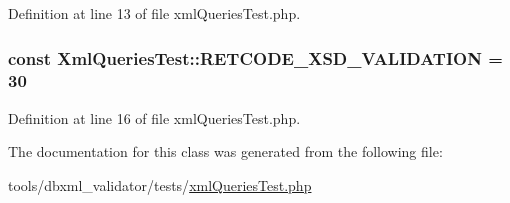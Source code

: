 Definition at line 13 of file xml\+Queries\+Test.\+php.

\hypertarget{classXmlQueriesTest_a0e375617451a3fc8ae53ce889d2ee3cf}{
\subsubsection[{R\+E\+T\+C\+O\+D\+E\+\_\+\+X\+S\+D\+\_\+\+V\+A\+L\+I\+D\+A\+T\+I\+O\+N}]{\setlength{\rightskip}{0pt plus 5cm}const Xml\+Queries\+Test\+::\+R\+E\+T\+C\+O\+D\+E\+\_\+\+X\+S\+D\+\_\+\+V\+A\+L\+I\+D\+A\+T\+I\+O\+N = 30}}\label{classXmlQueriesTest_a0e375617451a3fc8ae53ce889d2ee3cf}


Definition at line 16 of file xml\+Queries\+Test.\+php.



The documentation for this class was generated from the following file\+:\begin{DoxyCompactItemize}
\item 
tools/dbxml\+\_\+validator/tests/\hyperlink{xmlQueriesTest_8php}{xml\+Queries\+Test.\+php}\end{DoxyCompactItemize}
